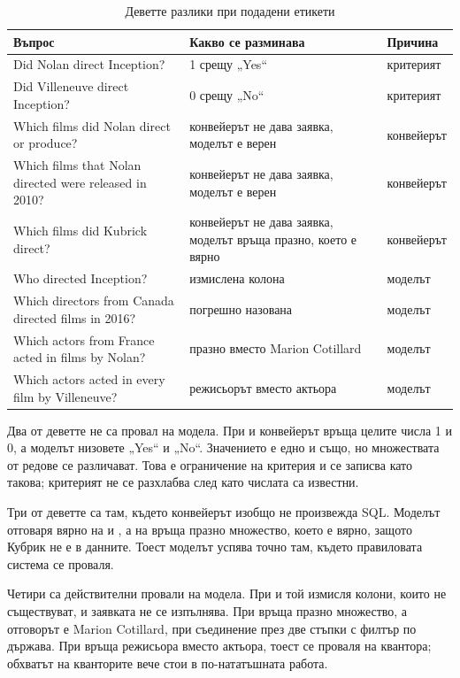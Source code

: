 \begin{table}[H]
\caption{Деветте разлики при подадени етикети}
\label{tab:llmdiffs}
\centering
\begin{tabular}{@{}L{6.0cm}L{5.6cm}L{2.6cm}@{}}
\toprule
\textbf{Въпрос} & \textbf{Какво се разминава} & \textbf{Причина} \\
\midrule
Did Nolan direct Inception? & 1 срещу „Yes“ & критерият \\
Did Villeneuve direct Inception? & 0 срещу „No“ & критерият \\
Which films did Nolan direct or produce? & конвейерът не дава заявка, моделът е верен & конвейерът \\
Which films that Nolan directed were released in 2010? & конвейерът не дава заявка, моделът е верен & конвейерът \\
Which films did Kubrick direct? & конвейерът не дава заявка, моделът връща празно, което е вярно & конвейерът \\
Who directed Inception? & измислена колона  & моделът \\
Which directors from Canada directed films in 2016? & погрешно назована  & моделът \\
Which actors from France acted in films by Nolan? & празно вместо Marion Cotillard & моделът \\
Which actors acted in every film by Villeneuve? & режисьорът вместо актьора & моделът \\
\bottomrule
\end{tabular}
\end{table}

Два от деветте не са провал на модела. При  и  конвейерът връща целите числа 1 и 0, а моделът низовете
„Yes“ и „No“. Значението е едно и също, но множествата от редове се различават. Това е
ограничение на критерия и се записва като такова; критерият не се разхлабва след като
числата са известни.

Три от деветте са там, където конвейерът изобщо не произвежда SQL. Моделът отговаря вярно
на  и , а на  връща празно
множество, което е вярно, защото Кубрик не е в данните. Тоест моделът успява точно там,
където правиловата система се проваля.

Четири са действителни провали на модела. При  и  той измисля колони, които не съществуват, и
заявката не се изпълнява. При 
връща празно множество, а отговорът е Marion Cotillard, при съединение през две стъпки с
филтър по държава. При  връща
режисьора вместо актьора, тоест се проваля на квантора; обхватът на кванторите вече стои в
по-нататъшната работа.

